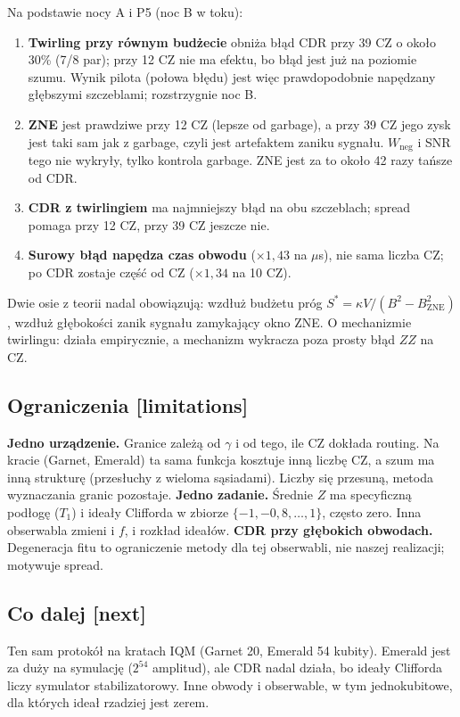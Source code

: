 \documentclass[11pt,a4paper]{article}
\newcommand{\slid}[1]{\hfill{\normalfont\small\ttfamily\color{axbluedk}[#1]}}
\begin{document}
Na podstawie nocy A i P5 (noc B w toku):
\begin{enumerate}
  \item \textbf{Twirling przy równym budżecie} obniża błąd CDR przy 39 CZ o około 30\% (7/8 par); przy
  12 CZ nie ma efektu, bo błąd jest już na poziomie szumu. Wynik pilota (połowa błędu) jest więc
  prawdopodobnie napędzany głębszymi szczeblami; rozstrzygnie noc B.
  \item \textbf{ZNE} jest prawdziwe przy 12 CZ (lepsze od garbage), a przy 39 CZ jego zysk jest taki
  sam jak z garbage, czyli jest artefaktem zaniku sygnału. $W_{\text{neg}}$ i SNR tego nie wykryły,
  tylko kontrola garbage. ZNE jest za to około 42 razy tańsze od CDR.
  \item \textbf{CDR z twirlingiem} ma najmniejszy błąd na obu szczeblach; spread pomaga przy 12 CZ, przy
  39 CZ jeszcze nie.
  \item \textbf{Surowy błąd napędza czas obwodu} ($\times1{,}43$ na $\mu$s), nie sama liczba CZ; po CDR
  zostaje część od CZ ($\times1{,}34$ na 10 CZ).
\end{enumerate}
Dwie osie z teorii nadal obowiązują: wzdłuż budżetu próg $S^*=\kappa V/(B^2-B_{\text{ZNE}}^2)$,
wzdłuż głębokości zanik sygnału zamykający okno ZNE. O mechanizmie twirlingu: działa empirycznie, a
mechanizm wykracza poza prosty błąd $ZZ$ na CZ.

\subsection{Ograniczenia \slid{limitations}}

\textbf{Jedno urządzenie.} Granice zależą od $\gamma$ i od tego, ile CZ dokłada routing. Na kracie
(Garnet, Emerald) ta sama funkcja kosztuje inną liczbę CZ, a szum ma inną strukturę (przesłuchy z
wieloma sąsiadami). Liczby się przesuną, metoda wyznaczania granic pozostaje.
\textbf{Jedno zadanie.} Średnie $Z$ ma specyficzną podłogę ($T_1$) i ideały Clifforda w zbiorze
$\{-1,-0{,}8,\dots,1\}$, często zero. Inna obserwabla zmieni i $f$, i rozkład ideałów.
\textbf{CDR przy głębokich obwodach.} Degeneracja fitu to ograniczenie metody dla tej obserwabli,
nie naszej realizacji; motywuje spread.

\subsection{Co dalej \slid{next}}

Ten sam protokół na kratach IQM (Garnet 20, Emerald 54 kubity). Emerald jest za duży na symulację
($2^{54}$ amplitud), ale CDR nadal działa, bo ideały Clifforda liczy symulator stabilizatorowy.
Inne obwody i obserwable, w tym jednokubitowe, dla których ideał rzadziej jest zerem.
\end{document}
